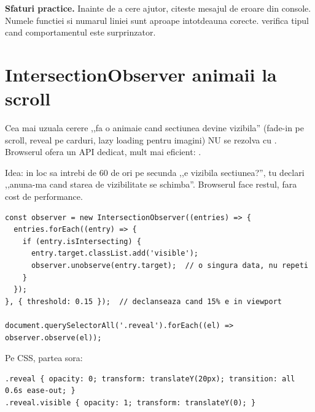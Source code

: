 \textbf{Sfaturi practice.} Inainte de a cere ajutor, citeste mesajul de eroare din console. Numele functiei si numarul liniei sunt aproape intotdeauna corecte.  verifica tipul cand comportamentul este surprinzator.

\section{IntersectionObserver \textendash{} animaii la scroll}

Cea mai uzuala cerere ,,fa o animaie cand sectiunea devine vizibila'' (fade-in pe scroll, reveal pe carduri, lazy loading pentru imagini) NU se rezolva cu . Browserul ofera un API dedicat, mult mai eficient: .

Idea: in loc sa intrebi de 60 de ori pe secunda ,,e vizibila sectiunea?'', tu declari ,,anuna-ma cand starea de vizibilitate se schimba''. Browserul face restul, fara cost de performance.

\begin{lstlisting}[style=js, caption={Fade-in pe scroll: pattern canonic in 10 linii}]
const observer = new IntersectionObserver((entries) => {
  entries.forEach((entry) => {
    if (entry.isIntersecting) {
      entry.target.classList.add('visible');
      observer.unobserve(entry.target);  // o singura data, nu repeti
    }
  });
}, { threshold: 0.15 });  // declanseaza cand 15% e in viewport

document.querySelectorAll('.reveal').forEach((el) => observer.observe(el));
\end{lstlisting}

Pe CSS, partea sora:

\begin{lstlisting}[style=css, numbers=none]
.reveal { opacity: 0; transform: translateY(20px); transition: all 0.6s ease-out; }
.reveal.visible { opacity: 1; transform: translateY(0); }
\end{lstlisting}

